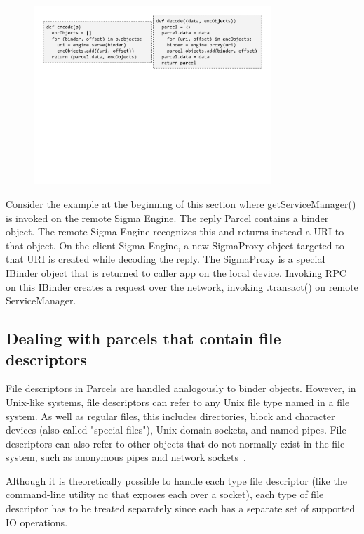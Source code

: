 \documentclass[prodmode]{acmlarge}
\begin{document}
\begin{figure}
\centering
\includegraphics[width=0.8\textwidth]{drawings/encodeObjects.pdf}
\end{figure}

Consider the example at the beginning of this section where getServiceManager() is invoked on the remote Sigma Engine. The reply Parcel contains a binder object. The remote Sigma Engine recognizes this and returns instead a URI to that object. On the client Sigma Engine, a new SigmaProxy object targeted to that URI is created while decoding the reply. The SigmaProxy is a special IBinder object that is returned to caller app on the local device. Invoking RPC on this IBinder creates a request over the network, invoking .transact() on remote ServiceManager.

\subsection{Dealing with parcels that contain file descriptors}

File descriptors in Parcels are handled analogously to binder objects. However, in Unix-like systems, file descriptors can refer to any Unix file type named in a file system. As well as regular files, this includes directories, block and character devices (also called "special files"), Unix domain sockets, and named pipes. File descriptors can also refer to other objects that do not normally exist in the file system, such as anonymous pipes and network sockets~\cite{UnixDomainSocket}.

Although it is theoretically possible to handle each type file descriptor (like the command-line utility nc that exposes each over a socket), each type of file descriptor has to be treated separately since each has a separate set of supported IO operations.
\end{document}
